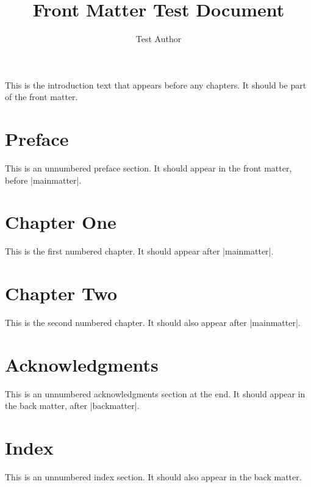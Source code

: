\documentclass[oneside]{memoir}
\title{\sffamily Front Matter Test Document}
\author{\sffamily Test Author}
\date{\sffamily }
\begin{document}
\frontmatter

\begin{titlingpage}
\maketitle
\end{titlingpage}

\tableofcontents


\cleardoublepage
This is the introduction text that appears before any chapters.
It should be part of the front matter.


\chapter{Preface}\label{preface}

This is an unnumbered preface section.
It should appear in the front matter, before \LeanVerb|mainmatter|.





\mainmatter
\chapter{Chapter One}\label{ch1}

This is the first numbered chapter.
It should appear after \LeanVerb|mainmatter|.




\chapter{Chapter Two}\label{ch2}

This is the second numbered chapter.
It should also appear after \LeanVerb|mainmatter|.





\backmatter
\chapter{Acknowledgments}\label{ack}

This is an unnumbered acknowledgments section at the end.
It should appear in the back matter, after \LeanVerb|backmatter|.




\chapter{Index}\label{index}

This is an unnumbered index section.
It should also appear in the back matter.
\end{document}
